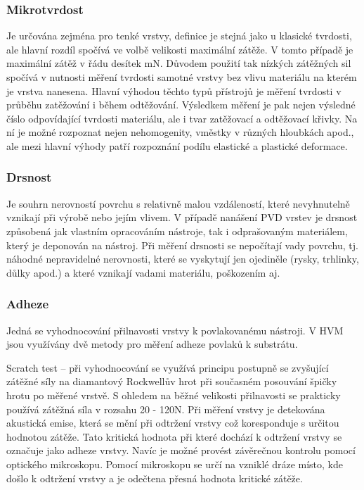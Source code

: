 \documentclass[12pt]{article}
\begin{document}
\subsubsection{Mikrotvrdost}
Je určována zejména pro tenké vrstvy, definice je stejná jako u klasické tvrdosti, ale hlavní rozdíl spočívá ve volbě velikosti maximální zátěže. V tomto případě je maximální zátěž v řádu desítek mN. Důvodem použití tak nízkých zátěžných sil spočívá v nutnosti měření tvrdosti samotné vrstvy bez vlivu materiálu na kterém je vrstva nanesena. Hlavní výhodou těchto typů přístrojů je měření tvrdosti v průběhu zatěžování i během odtěžování. Výsledkem měření je pak nejen výsledné číslo odpovídající tvrdosti materiálu, ale i tvar zatěžovací a odtěžovací křivky. Na ní je možné rozpoznat nejen nehomogenity, vměstky v různých hloubkách apod., ale mezi hlavní výhody patří rozpoznání podílu elastické a plastické deformace.  

\subsubsection{Drsnost}
Je souhrn nerovností povrchu s relativně malou vzdáleností, které nevyhnutelně vznikají při výrobě nebo jejím vlivem. V případě nanášení PVD vrstev je drsnost způsobená jak vlastním opracováním nástroje, tak i odprašovaným materiálem, který je deponován na nástroj. Při měření drsnosti se nepočítají vady povrchu, tj. náhodné nepravidelné nerovnosti, které se vyskytují jen ojediněle (rysky, trhlinky, důlky apod.) a které vznikají vadami materiálu, poškozením aj.

\subsubsection{Adheze}
Jedná se vyhodnocování přilnavosti vrstvy k povlakovanému nástroji. V HVM jsou využívány dvě metody pro měření adheze povlaků k substrátu.

Scratch test -- při vyhodnocování se využívá principu postupně se zvyšující zátěžné síly na diamantový Rockwellův hrot při současném posouvání špičky hrotu po měřené vrstvě. S ohledem na běžné velikosti přilnavosti se prakticky používá zátěžná síla v rozsahu 20 - 120N. Při měření vrstvy je detekována akustická emise, která se mění při odtržení vrstvy což koresponduje s určitou hodnotou zátěže. Tato kritická hodnota při které dochází k odtržení vrstvy se označuje jako adheze vrstvy. Navíc je možné provést závěrečnou kontrolu pomocí optického mikroskopu. Pomocí mikroskopu se určí na vzniklé dráze místo, kde došlo k odtržení vrstvy a je odečtena přesná hodnota kritické zátěže.
\end{document}
